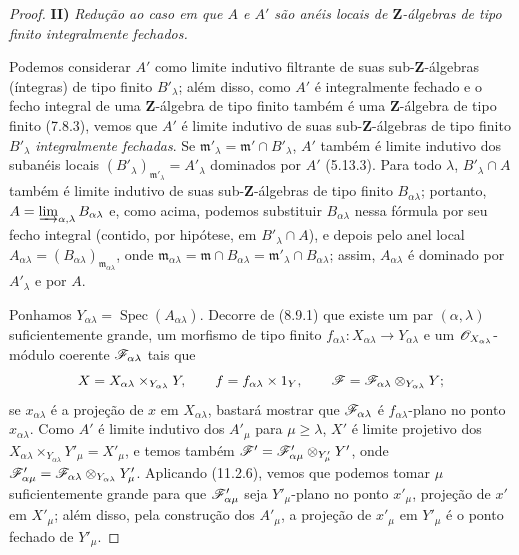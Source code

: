 \begin{proof}
\medskip
\noindent\textbf{II)} \emph{Redução
ao caso em que $A$ e $A'$
são anéis locais de
$\mathbf Z$-álgebras de tipo
finito integralmente fechados.}

Podemos considerar $A'$ como
limite indutivo filtrante de
suas sub-$\mathbf Z$-álgebras
(íntegras) de tipo finito
$B'_{\lambda}$; além disso,
como $A'$ é integralmente
fechado e o fecho integral de
uma $\mathbf Z$-álgebra de tipo
finito também é uma
$\mathbf Z$-álgebra de tipo
finito (7.8.3), vemos que
$A'$ é limite indutivo de suas
sub-$\mathbf Z$-álgebras de
tipo finito $B'_{\lambda}$
\emph{integralmente fechadas}.
Se $\mathfrak m'_{\lambda}
=\mathfrak m'\cap B'_{\lambda}$,
$A'$ também é limite indutivo
dos subanéis locais
$(B'_{\lambda})_{\mathfrak m'_{\lambda}}
=A'_{\lambda}$ dominados por
$A'$ (5.13.3). Para todo
$\lambda$, $B'_{\lambda}\cap A$
também é limite indutivo de
suas sub-$\mathbf Z$-álgebras
de tipo finito $B_{\alpha\lambda}$;
portanto,
$A=\varinjlim_{\alpha,\lambda}
B_{\alpha\lambda}$ e, como
acima, podemos substituir
$B_{\alpha\lambda}$ nessa
fórmula por seu fecho integral
(contido, por hipótese, em
$B'_{\lambda}\cap A$), e depois
pelo anel local
$A_{\alpha\lambda}
=(B_{\alpha\lambda})_{\mathfrak m_{\alpha\lambda}}$,
onde $\mathfrak m_{\alpha\lambda}
=\mathfrak m\cap B_{\alpha\lambda}
=\mathfrak m'_{\lambda}\cap
B_{\alpha\lambda}$; assim,
$A_{\alpha\lambda}$ é dominado
por $A'_{\lambda}$ e por $A$.

Ponhamos
$Y_{\alpha\lambda}
=\operatorname{Spec}(A_{\alpha\lambda})$.
Decorre de (8.9.1) que existe
um par $(\alpha,\lambda)$
suficientemente grande, um
morfismo de tipo finito
$f_{\alpha\lambda}:
X_{\alpha\lambda}\to
Y_{\alpha\lambda}$ e um
$\mathscr{O}_{X_{\alpha\lambda}}$-módulo
coerente $\mathscr{F}_{\alpha\lambda}$
tais que
\[
X=X_{\alpha\lambda}
\times_{Y_{\alpha\lambda}}Y,
\qquad
f=f_{\alpha\lambda}\times1_Y,
\qquad
\mathscr{F}=\mathscr{F}_{\alpha\lambda}
\otimes_{Y_{\alpha\lambda}}Y;
\]
se $x_{\alpha\lambda}$ é a
projeção de $x$ em
$X_{\alpha\lambda}$, bastará
mostrar que $\mathscr{F}_{\alpha\lambda}$
é $f_{\alpha\lambda}$-plano
no ponto $x_{\alpha\lambda}$.
Como $A'$ é limite indutivo
dos $A'_{\mu}$ para
$\mu\geq\lambda$, $X'$ é
limite projetivo dos
$X_{\alpha\lambda}
\times_{Y_{\alpha\lambda}}Y'_{\mu}
=X'_{\mu}$, e temos também
$\mathscr{F}'=\mathscr{F}'_{\alpha\mu}
\otimes_{Y'_{\mu}}Y'$, onde
$\mathscr{F}'_{\alpha\mu}
=\mathscr{F}_{\alpha\lambda}
\otimes_{Y_{\alpha\lambda}}Y'_{\mu}$.
Aplicando (11.2.6), vemos
que podemos tomar $\mu$
suficientemente grande para
que $\mathscr{F}'_{\alpha\mu}$
seja $Y'_{\mu}$-plano no ponto
$x'_{\mu}$, projeção de $x'$
em $X'_{\mu}$; além disso,
pela construção dos $A'_{\mu}$,
a projeção de $x'_{\mu}$ em
$Y'_{\mu}$ é o ponto fechado
de $Y'_{\mu}$.


\end{proof}
